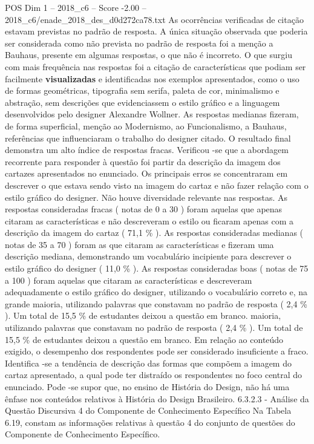 \begin{textsample}{POS Dim 1 – 2018\_c6 – Score -2.00 – 2018\_c6/enade\_2018\_des\_d0d272ca78.txt}
As ocorrências verificadas de citação estavam previstas no padrão de resposta.
A única situação observada que poderia ser considerada como não prevista no padrão de resposta foi a menção a Bauhaus, presente em algumas respostas, o que não é incorreto.
O que surgiu com mais frequência nas respostas foi a citação de características que podiam ser facilmente \textbf{visualizadas} e identificadas nos exemplos apresentados, como o uso de formas geométricas, tipografia sem serifa, paleta de cor, minimalismo e abstração, sem descrições que evidenciassem o estilo gráfico e a linguagem desenvolvidos pelo designer Alexandre Wollner.
As respostas medianas fizeram, de forma superficial, menção ao Modernismo, ao Funcionalismo, a Bauhaus, referências que influenciaram o trabalho do designer citado.
O resultado final demonstra um alto índice de respostas fracas.
Verificou -se que a abordagem recorrente para responder à questão foi partir da descrição da imagem dos cartazes apresentados no enunciado.
Os principais erros se concentraram em descrever o que estava sendo visto na imagem do cartaz e não fazer relação com o estilo gráfico do designer.
Não houve diversidade relevante nas respostas.
As respostas consideradas fracas ( notas de 0 a 30 ) foram aquelas que apenas citaram as características e não descreveram o estilo ou ficaram apenas com a descrição da imagem do cartaz ( 71,1 \% ).
As respostas consideradas medianas ( notas de 35 a 70 ) foram as que citaram as características e fizeram uma descrição mediana, demonstrando um vocabulário incipiente para descrever o estilo gráfico do designer ( 11,0 \% ).
As respostas consideradas boas ( notas de 75 a 100 ) foram aquelas que citaram as características e descreveram adequadamente o estilo gráfico do designer, utilizando o vocabulário correto e, na grande maioria, utilizando palavras que constavam no padrão de resposta ( 2,4 \% ).
Um total de 15,5 \% de estudantes deixou a questão em branco. maioria, utilizando palavras que constavam no padrão de resposta ( 2,4 \% ).
Um total de 15,5 \% de estudantes deixou a questão em branco.
Em relação ao conteúdo exigido, o desempenho dos respondentes pode ser considerado insuficiente a fraco.
Identifica -se a tendência de descrição das formas que compõem a imagem do cartaz apresentado, a qual pode ter distraído os respondentes no foco central do enunciado.
Pode -se supor que, no ensino de História do Design, não há uma ênfase nos conteúdos relativos à História do Design Brasileiro. 6.3.2.3 - Análise da Questão Discursiva 4 do Componente de Conhecimento Específico Na Tabela 6.19, constam as informações relativas à questão 4 do conjunto de questões do Componente de Conhecimento Específico.

\end{textsample}
